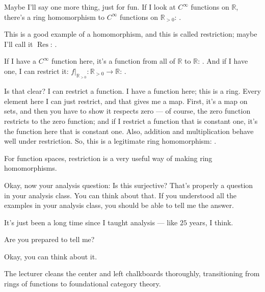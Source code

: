 \begin{speech}[01:03:45 - 01:05:45]
Maybe I'll say one more thing, just for fun. If I look at $C^\infty$ functions on $\mathbb{R}$,  there's a ring homomorphism to $C^\infty$ functions on $\mathbb{R}_{>0}$: .

This is a good example of a homomorphism, and this is called restriction; maybe I'll call it $\operatorname{Res}$: .

If I have a $C^\infty$ function here, it's a function from all of $\mathbb{R}$ to $\mathbb{R}$: . And if I have one, I can restrict it: $f|_{\mathbb{R}_{>0}} \colon \mathbb{R}_{>0} \to \mathbb{R}$: .

Is that clear? I can restrict a function. I have a function here; this is a ring. Every element here I can just restrict, and that gives me a map. First, it's a map on sets, and then you have to show it respects zero --- of course, the zero function restricts to the zero function; and if I restrict a function that is constant one, it's the function here that is constant one. Also, addition and multiplication behave well under restriction. So, this is a legitimate ring homomorphism: .

For function spaces, restriction is a very useful way of making ring homomorphisms.

Okay, now your analysis question: Is this surjective? That's properly a question in your analysis class. You can think about that. If you understood all the examples in your analysis class, you should be able to tell me the answer.
\end{speech}

\begin{speech}[01:05:45 - 01:06:13]
It's just been a long time since I taught analysis --- like $25$ years, I think.

 Are you prepared to tell me?

Okay, you can think about it.
\end{speech}

\begin{note}
The lecturer cleans the center and left chalkboards thoroughly, transitioning from rings of functions to foundational category theory.
\end{note}

